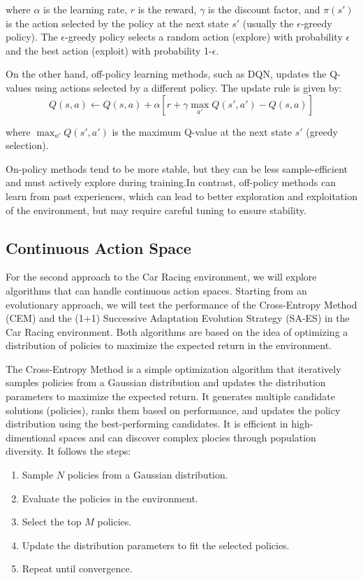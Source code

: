 \documentclass[../CSC_52081_EP.tex]{subfiles}
\begin{document}
    where $\alpha$ is the learning rate, $r$ is the reward, $\gamma$ is the discount factor, and $\pi(s')$ is the action selected by the policy at the next state $s'$ (usually the $\epsilon$-greedy policy).
    The $\epsilon$-greedy policy selects a random action (explore) with probability $\epsilon$ and the best action (exploit) with probability 1-$\epsilon$.
    
    On the other hand, off-policy learning methods, such as DQN, updates the Q-values using actions selected by a different policy. The update rule is given by:
    \begin{equation}
        Q(s, a) \leftarrow Q(s, a) + \alpha \left[ r + \gamma \max_{a'} Q(s', a') - Q(s, a) \right]
    \end{equation}
    
    where $\max_{a'} Q(s', a')$ is the maximum Q-value at the next state $s'$ (greedy selection).

    On-policy methods tend to be more stable, but they can be less sample-efficient and must actively explore during training.In contrast, off-policy methods can learn from past experiences, which can lead to better exploration and exploitation of the environment, but may require careful tuning to ensure stability.

    \subsection{Continuous Action Space}

    For the second approach to the Car Racing environment, we will explore algorithms that can handle continuous action spaces.
    Starting from an evolutionary approach, we will test the performance of the Cross-Entropy Method (CEM) and the (1+1) Successive Adaptation Evolution Strategy (SA-ES) in the Car Racing environment.
    Both algorithms are based on the idea of optimizing a distribution of policies to maximize the expected return in the environment.

    The Cross-Entropy Method is a simple optimization algorithm that iteratively samples policies from a Gaussian distribution and updates the distribution parameters to maximize the expected return.
    It generates multiple candidate solutions (policies), ranks them based on performance, and updates the policy distribution using the best-performing candidates. It is efficient in high-dimentional spaces and can discover complex plocies through population diversity. It follows the steps:
    \begin{enumerate}
        \item Sample $N$ policies from a Gaussian distribution.
        \item Evaluate the policies in the environment.
        \item Select the top $M$ policies.
        \item Update the distribution parameters to fit the selected policies.
        \item Repeat until convergence.
    \end{enumerate}
\end{document}
